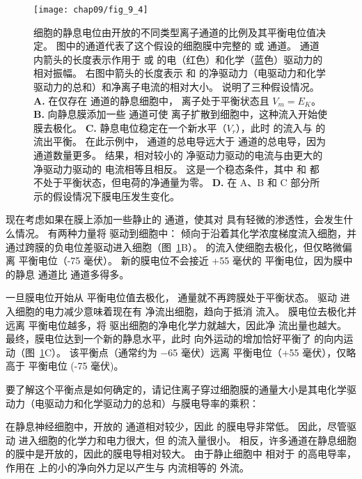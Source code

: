 \begin{figure}[htbp]
	\centering
	\texttt{[image: chap09/fig\_9\_4]}
	\caption{细胞的静息电位由开放的不同类型离子通道的比例及其平衡电位值决定。
		图中的通道代表了这个假设的细胞膜中完整的  或  通道。
		通道内箭头的长度表示作用于  或  的电（红色）和化学（蓝色）驱动力的相对振幅。
		右图中箭头的长度表示  和  的净驱动力（电驱动力和化学驱动力的总和）和净离子电流的相对大小。
		说明了三种假设情况。
		\textbf{A.} 在仅存在  通道的静息细胞中， 离子处于平衡状态且 $V_m = E_K$。
		\textbf{B.} 向静息膜添加一些  通道可使  离子扩散到细胞中，这种流入开始使膜去极化。
		\textbf{C.} 静息电位稳定在一个新水平（$V_r$），此时  的流入与  的流出平衡。
		在此示例中， 通道的总电导远大于  通道的总电导，因为  通道数量更多。
		结果，相对较小的  净驱动力驱动的电流与由更大的  净驱动力驱动的  电流相等且相反。
		这是一个稳态条件，其中  和  都不处于平衡状态，但电荷的净通量为零。
		\textbf{D.} 在 A、B 和 C 部分所示的假设情况下膜电压发生变化。}
	\label{fig:9_4}
\end{figure}


现在考虑如果在膜上添加一些静止的  通道，使其对  具有轻微的渗透性，会发生什么情况。
有两种力量将  驱动到细胞中： 倾向于沿着其化学浓度梯度流入细胞，并通过跨膜的负电位差驱动进入细胞（图~\ref{fig:9_4}B）。
 的流入使细胞去极化，但仅略微偏离  平衡电位（-75 毫伏）。
新的膜电位不会接近 +55 毫伏的  平衡电位，因为膜中的静息  通道比  通道多得多。


一旦膜电位开始从  平衡电位值去极化， 通量就不再跨膜处于平衡状态。
驱动  进入细胞的电力减少意味着现在有  净流出细胞，趋向于抵消  流入。
膜电位去极化并远离  平衡电位越多，将  驱出细胞的净电化学力就越大，因此净  流出量也越大。
最终，膜电位达到一个新的静息水平，此时  向外运动的增加恰好平衡了  的向内运动（图~\ref{fig:9_4}C）。
该平衡点（通常约为 −65 毫伏）远离  平衡电位（+55 毫伏），仅略高于  平衡电位 (-75 毫伏)。


要了解这个平衡点是如何确定的，请记住离子穿过细胞膜的通量大小是其电化学驱动力（电驱动力和化学驱动力的总和）与膜电导率的乘积：


在静息神经细胞中，开放的  通道相对较少，因此  的膜电导非常低。
因此，尽管驱动  进入细胞的化学力和电力很大，但  的流入量很小。
相反，许多通道在静息细胞的膜中是开放的，因此的膜电导相对较大。
由于静止细胞中  相对于  的高电导率，作用在  上的小的净向外力足以产生与  内流相等的  外流。



